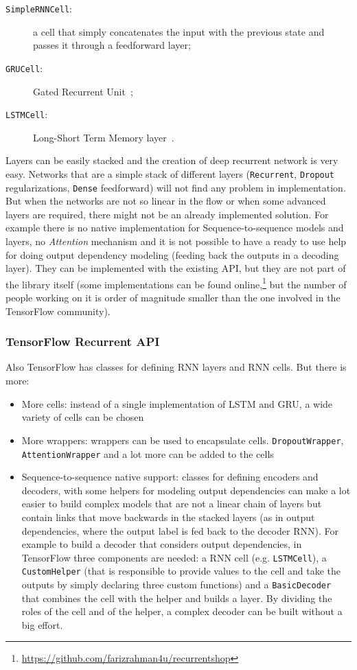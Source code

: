 \begin{description}
	\item[\texttt{SimpleRNNCell}:] a cell that simply concatenates the input with the previous state and passes it through a feedforward layer;
	\item[\texttt{GRUCell}:] Gated Recurrent Unit~\cite{cho2014learning};
	\item[\texttt{LSTMCell}:] Long-Short Term Memory layer~\cite{hochreiter1997long}.
\end{description}

Layers can be easily stacked and the creation of deep recurrent network is very easy. Networks that are a simple stack of different layers (\texttt{Recurrent}, \texttt{Dropout} regularizations, \texttt{Dense} feedforward) will not find any problem in implementation. But when the networks are not so linear in the flow or when some advanced layers are required, there might not be an already implemented solution. For example there is no native implementation for Sequence-to-sequence models and layers, no \textit{Attention} mechanism and it is not possible to have a ready to use help for doing output dependency modeling (feeding back the outputs in a decoding layer). They can be implemented with the existing API, but they are not part of the library itself (some implementations can be found online,\footnote{\url{https://github.com/farizrahman4u/recurrentshop}} but the number of people working on it is order of magnitude smaller than the one involved in the TensorFlow community).

\subsubsection{TensorFlow Recurrent API}
Also TensorFlow has classes for defining RNN layers and RNN cells. But there is more:

\begin{itemize}
	\item More cells: instead of a single implementation of LSTM and GRU, a wide variety of cells can be chosen
	\item More wrappers: wrappers can be used to encapsulate cells. \texttt{DropoutWrapper}, \texttt{AttentionWrapper} and a lot more can be added to the cells
	\item Sequence-to-sequence native support: classes for defining encoders and decoders, with some helpers for modeling output dependencies can make a lot easier to build complex models that are not a linear chain of layers but contain links that move backwards in the stacked layers (as in output dependencies, where the output label is fed back to the decoder RNN). For example to build a decoder that considers output dependencies, in TensorFlow three components are needed: a RNN cell (e.g. \texttt{LSTMCell}), a \texttt{CustomHelper} (that is responsible to provide values to the cell and take the outputs by simply declaring three custom functions) and a \texttt{BasicDecoder} that combines the cell with the helper and builds a layer. By dividing the roles of the cell and of the helper, a complex decoder can be built without a big effort.
\end{itemize}

